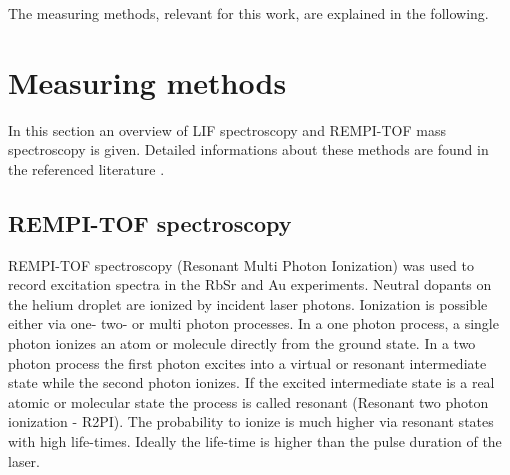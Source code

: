 \documentclass[parskip,12pt,headsepline,a4paper] {scrbook}
\begin{document}
The measuring methods, relevant for this work, are explained in the following.

\section{Measuring methods}
\label{chap:methods}
\vspace{-1\baselineskip}
In this section an overview of LIF spectroscopy and REMPI-TOF mass spectroscopy is given. Detailed informations about these methods are found in the referenced literature \cite{demtr-laser} \cite{lackner} \cite{lackner-doc}.


\subsection{REMPI-TOF spectroscopy}
\vspace{-1\baselineskip}
REMPI-TOF spectroscopy (Resonant Multi Photon Ionization) was used to record excitation spectra in the RbSr and Au experiments. Neutral dopants on the helium droplet are ionized by incident laser photons. Ionization is possible either via one- two- or multi photon processes. In a one photon process, a single photon ionizes an atom or molecule directly from the ground state. In a two photon process the first photon excites into a virtual or resonant intermediate state while the second photon ionizes. If the excited intermediate state is a real atomic or molecular state the process is called resonant (Resonant two photon ionization - R2PI). The probability to ionize is much higher via resonant states with high life-times. Ideally the life-time is higher than the pulse duration of the laser. %
\end{document}
